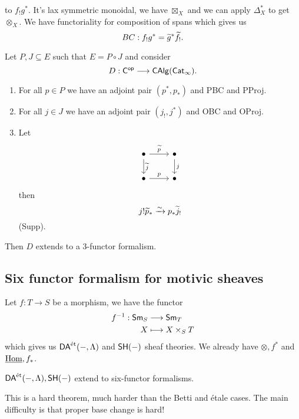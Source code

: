 to $f_!g^{*}$. It's lax symmetric monoidal, we have $\boxtimes_X$ and we can apply
$\Delta_X^{*}$ to get $\otimes_X$. We have functoriality for composition of spans which gives us
\[
BC:f_!g^{*} = \widetilde{g}^{*}\widetilde{f}_!.
\]
\begin{theorem}[Fake]
Let $P,J\subseteq E$ such that $E=P\circ J$ and consider
\[
D:\C\op \to \cat{CAlg}(\cat{Cat}_\infty).
\]
\begin{enumerate}[1)]
\item For all $p\in P$ we have an adjoint pair $(p^{*},p_*)$ and PBC and PProj.
\item For all $j\in J$ we have an adjoint pair $(j_!,j^{*})$ and OBC and OProj.
\item Let
\[
\begin{tikzcd}
\bullet \ar[r,"\wt{p}"] \ar[d,"\wt{j}"] & \bullet \ar[d,"j"] \\
\bullet \ar[r,"p"] & \bullet
\end{tikzcd}
\]
then
\[
j!\widetilde{p}_* \xrightarrow{\sim} p_*\widetilde{j}_!
\]
(Supp).
\end{enumerate}
Then $D$ extends to a 3-functor formalism.
\end{theorem}
\subsection{Six functor formalism for motivic sheaves}
Let $f:T\to S$ be a morphism, we have the functor
\begin{align*}
f^{-1}: \mathsf{Sm}_S &\longrightarrow \mathsf{Sm}_T \\
X &\longmapsto X\times_S T
\end{align*}
which gives us $\mathsf{DA}^\text{\'et}(-,\Lambda)$ and $\mathsf{SH}(-)$ sheaf theories. We already have $\otimes,
f^{*}$ and $\underline{\operatorname{Hom}},f_*$.
\begin{theorem}
$\mathsf{DA}^\text{\'et}(-,\Lambda), \mathsf{SH}(-)$ extend to six-functor formalisms.
\end{theorem}
This is a hard theorem, much harder than the Betti and \'etale cases. The main difficulty
is that proper base change is hard!

